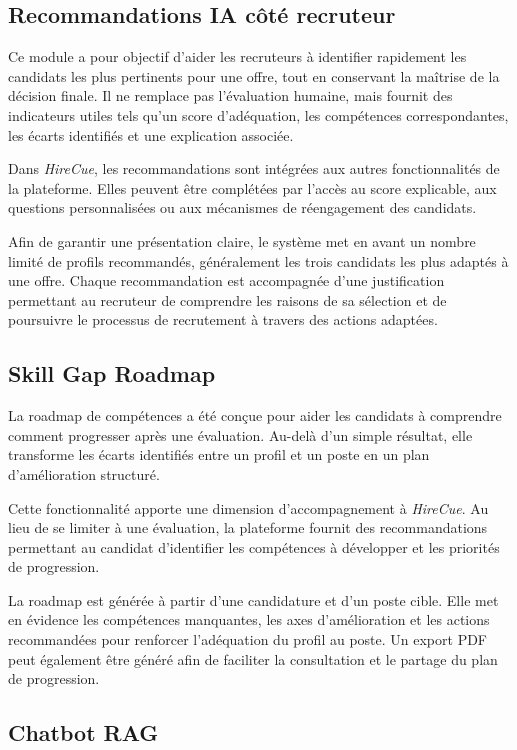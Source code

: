\subsection{Recommandations IA côté recruteur}

Ce module a pour objectif d'aider les recruteurs à identifier rapidement les candidats les plus pertinents pour une offre, tout en conservant la maîtrise de la décision finale. Il ne remplace pas l'évaluation humaine, mais fournit des indicateurs utiles tels qu'un score d'adéquation, les compétences correspondantes, les écarts identifiés et une explication associée.

Dans \textit{HireCue}, les recommandations sont intégrées aux autres fonctionnalités de la plateforme. Elles peuvent être complétées par l'accès au score explicable, aux questions personnalisées ou aux mécanismes de réengagement des candidats.

Afin de garantir une présentation claire, le système met en avant un nombre limité de profils recommandés, généralement les trois candidats les plus adaptés à une offre. Chaque recommandation est accompagnée d'une justification permettant au recruteur de comprendre les raisons de sa sélection et de poursuivre le processus de recrutement à travers des actions adaptées.
\subsection{Skill Gap Roadmap}

La roadmap de compétences a été conçue pour aider les candidats à comprendre comment progresser après une évaluation. Au-delà d'un simple résultat, elle transforme les écarts identifiés entre un profil et un poste en un plan d'amélioration structuré.

Cette fonctionnalité apporte une dimension d'accompagnement à \textit{HireCue}. Au lieu de se limiter à une évaluation, la plateforme fournit des recommandations permettant au candidat d'identifier les compétences à développer et les priorités de progression.

La roadmap est générée à partir d'une candidature et d'un poste cible. Elle met en évidence les compétences manquantes, les axes d'amélioration et les actions recommandées pour renforcer l'adéquation du profil au poste. Un export PDF peut également être généré afin de faciliter la consultation et le partage du plan de progression.

\subsection{Chatbot RAG}

